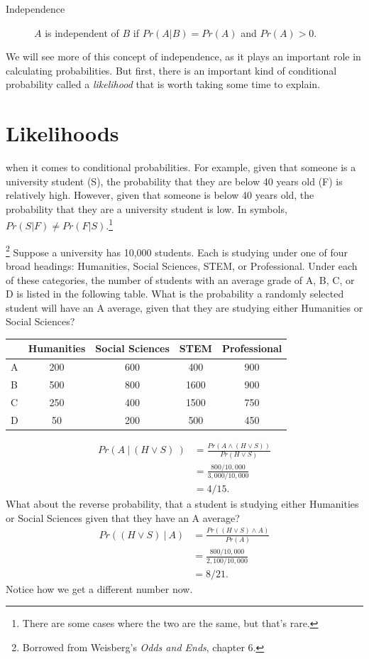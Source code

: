 \documentclass[]{tufte-book}
\begin{document}
\begin{description}
\item[Independence]
\(A\) is independent of \(B\) if \(Pr(A | B) = Pr(A)\) and \(Pr(A) > 0\).
\end{description}

We will see more of this concept of independence, as it plays an important role in calculating probabilities. But first, there is an important kind of conditional probability called a \emph{likelihood} that is worth taking some time to explain.

\hypertarget{likelihoods}{%
\section{Likelihoods}\label{likelihoods}}

 when it comes to conditional probabilities. For example, given that someone is a university student (S), the probability that they are below 40 years old (F) is relatively high. However, given that someone is below 40 years old, the probability that they are a university student is low. In symbols, \(Pr(S|F)\neq Pr(F|S)\).\footnote{There are some cases where the two are the same, but that's rare.}

\footnote{Borrowed from Weisberg's \emph{Odds and Ends}, chapter 6.} Suppose a university has 10,000 students. Each is studying under one of four broad headings: Humanities, Social Sciences, STEM, or Professional. Under each of these categories, the number of students with an average grade of A, B, C, or D is listed in the following table. What is the probability a randomly selected student will have an A average, given that they are studying either Humanities or Social Sciences?

\begin{longtable}[]{@{}lcccc@{}}
\toprule
& Humanities & Social Sciences & STEM & Professional\tabularnewline
\midrule
\endhead
A & 200 & 600 & 400 & 900\tabularnewline
B & 500 & 800 & 1600 & 900\tabularnewline
C & 250 & 400 & 1500 & 750\tabularnewline
D & 50 & 200 & 500 & 450\tabularnewline
\bottomrule
\end{longtable}

\[
  \begin{aligned}
    Pr(A ~ | ~(H \vee S)~) &= \frac{Pr(A \wedge (H \vee S))}{Pr(H \vee S)}\\
                           &= \frac{800/10,000}{3,000/10,000}\\
                           &= 4/15.
  \end{aligned}
\]
What about the reverse probability, that a student is studying either Humanities or Social Sciences given that they have an A average?
\[
  \begin{aligned}
    Pr((H \vee S) ~ | ~ A) &= \frac{Pr((H \vee S) \wedge A)}{Pr(A)}\\
                           &= \frac{800/10,000}{2,100/10,000}\\
                           &= 8/21.
  \end{aligned}
\]
Notice how we get a different number now.
\end{document}
